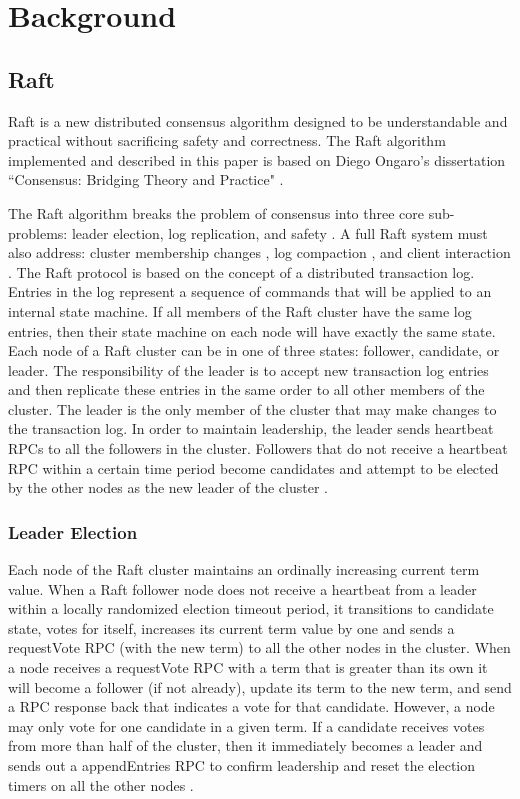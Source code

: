 \documentclass[conference,compsoc]{./IEEEtran/IEEEtran}
\begin{document}
\section{Background}

\subsection{Raft}

Raft is a new distributed consensus algorithm designed to be
understandable and practical without sacrificing safety and
correctness. The Raft algorithm implemented and described in this
paper is based on Diego Ongaro's dissertation ``Consensus: Bridging
Theory and Practice" \cite{raft_thesis:ongaro14}.

The Raft algorithm breaks the problem of consensus into three core
sub-problems: leader election, log replication, and safety
\cite[Section~3]{raft_thesis:ongaro14}. A full Raft system must also
address: cluster membership changes
\cite[Section~4]{raft_thesis:ongaro14}, log compaction
\cite[Section~5]{raft_thesis:ongaro14}, and client interaction
\cite[Section~6]{raft_thesis:ongaro14}. The Raft protocol is based on
the concept of a distributed transaction log. Entries in the log
represent a sequence of commands that will be applied to an internal
state machine. If all members of the Raft cluster have the same log
entries, then their state machine on each node will have exactly the
same state. Each node of a Raft cluster can be in one of three states:
follower, candidate, or leader. The responsibility of the leader is to
accept new transaction log entries and then replicate these entries in
the same order to all other members of the cluster. The leader is the
only member of the cluster that may make changes to the transaction
log. In order to maintain leadership, the leader sends heartbeat RPCs
to all the followers in the cluster.  Followers that do not receive
a heartbeat RPC within a certain time period become candidates and
attempt to be elected by the other nodes as the new leader of the
cluster \cite[p.~12]{raft_thesis:ongaro14}.

\subsubsection{Leader Election}

Each node of the Raft cluster maintains an ordinally increasing
current term value. When a Raft follower node does not receive
a heartbeat from a leader within a locally randomized election timeout
period, it transitions to candidate state, votes for itself, increases
its current term value by one and sends a requestVote RPC (with the
new term) to all the other nodes in the cluster. When a node receives
a requestVote RPC with a term that is greater than its own it will
become a follower (if not already), update its term to the new term,
and send a RPC response back that indicates a vote for that candidate.
However, a node may only vote for one candidate in a given term. If
a candidate receives votes from more than half of the cluster, then it
immediately becomes a leader and sends out a appendEntries RPC to
confirm leadership and reset the election timers on all the other
nodes \cite[Section~3.4]{raft_thesis:ongaro14}.
\end{document}
